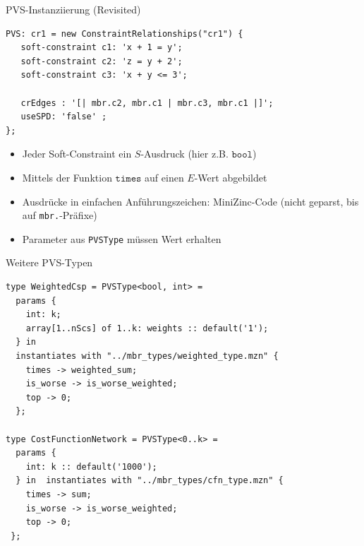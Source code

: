 %
%
%

\begin{frame}[fragile]{PVS-Instanziierung (Revisited)}
\begin{lstlisting}
PVS: cr1 = new ConstraintRelationships("cr1") {
   soft-constraint c1: 'x + 1 = y';
   soft-constraint c2: 'z = y + 2';
   soft-constraint c3: 'x + y <= 3';
   
   crEdges : '[| mbr.c2, mbr.c1 | mbr.c3, mbr.c1 |]';
   useSPD: 'false' ;
}; 
\end{lstlisting}
\begin{itemize}
\item Jeder Soft-Constraint ein $S$-Ausdruck (hier z.B. $\mathtt{bool}$)
\item Mittels der Funktion $\mathtt{times}$ auf einen $E$-Wert abgebildet
\item Ausdrücke in einfachen Anführungszeichen: \alert{MiniZinc}-Code (nicht geparst, bis auf \texttt{mbr.}-Präfixe)
\item Parameter aus \texttt{PVSType} müssen Wert erhalten
\end{itemize}
\end{frame}

\begin{frame}[fragile]{Weitere PVS-Typen}
\begin{lstlisting}
type WeightedCsp = PVSType<bool, int> = 
  params {
    int: k; 
    array[1..nScs] of 1..k: weights :: default('1');
  } in  
  instantiates with "../mbr_types/weighted_type.mzn" {
    times -> weighted_sum;
    is_worse -> is_worse_weighted;
    top -> 0;
  };
  
type CostFunctionNetwork = PVSType<0..k> = 
  params {
    int: k :: default('1000'); 
  } in  instantiates with "../mbr_types/cfn_type.mzn" {
    times -> sum;
    is_worse -> is_worse_weighted; 
    top -> 0;
 };
\end{lstlisting}
\end{frame}

